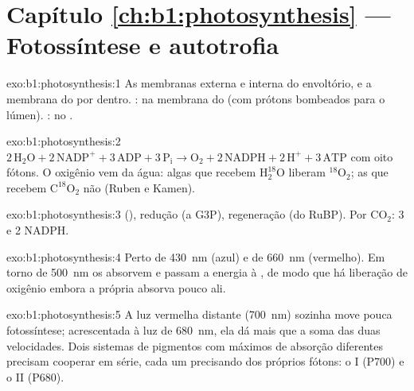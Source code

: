 \section*{Capítulo \ref{ch:b1:photosynthesis} --- Fotossíntese e autotrofia}

\begin{solution}{exo:b1:photosynthesis:1}
As membranas externa e interna do envoltório, e a membrana do 
por dentro. : na membrana do  (com prótons
bombeados para o lúmen). : no .
\end{solution}

\begin{solution}{exo:b1:photosynthesis:2}
$2\,\mathrm{H_2O} + 2\,\mathrm{NADP^+} + 3\,\mathrm{ADP} + 3\,\mathrm{P_i}
\to \mathrm{O_2} + 2\,\mathrm{NADPH} + 2\,\mathrm{H^+} + 3\,\mathrm{ATP}$
com oito fótons. O oxigênio vem da água: algas que recebem
$\mathrm{H_2^{18}O}$ liberam $\mathrm{^{18}O_2}$; as que recebem
$\mathrm{C^{18}O_2}$ não (Ruben e Kamen).
\end{solution}

\begin{solution}{exo:b1:photosynthesis:3}
 (), redução (a G3P), regeneração (do RuBP). Por
$\mathrm{CO_2}$: 3  e 2 NADPH.
\end{solution}

\begin{solution}{exo:b1:photosynthesis:4}
Perto de \qty{430}{nm} (azul) e de \qty{660}{nm} (vermelho). Em torno de
\qty{500}{nm} os  absorvem e passam a energia à ,
de modo que há liberação de oxigênio embora a própria  absorva
pouco ali.
\end{solution}

\begin{solution}{exo:b1:photosynthesis:5}
A luz vermelha distante (\qty{700}{nm}) sozinha move pouca fotossíntese;
acrescentada à luz de \qty{680}{nm}, ela dá mais que a soma das duas
velocidades. Dois sistemas de pigmentos com máximos de absorção
diferentes precisam cooperar em série, cada um precisando dos próprios
fótons: o  I (P700) e o  II (P680).
\end{solution}

